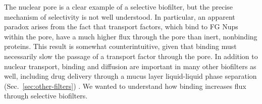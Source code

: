 %
%

The nuclear pore is a clear example of a selective biofilter, but the precise mechanism of selectivity is not well understood.  In particular, an apparent paradox arises from the fact that transport factors, which bind to FG Nups within the pore, have a much higher flux through the pore than inert, nonbinding proteins.  This result is somewhat counterintuitive, given that binding must necessarily slow the passage of a transport factor through the pore.  In addition to nuclear transport, binding and diffusion are important in many other biofilters as well, including drug delivery through a mucus layer liquid-liquid phase separation (Sec.~\ref{sec:other-filters}) \cite{schneider17, huang17, mastorakos15,brangwynne15, feric16,witten17}.  We wanted to understand how binding increases flux through selective biofilters.

